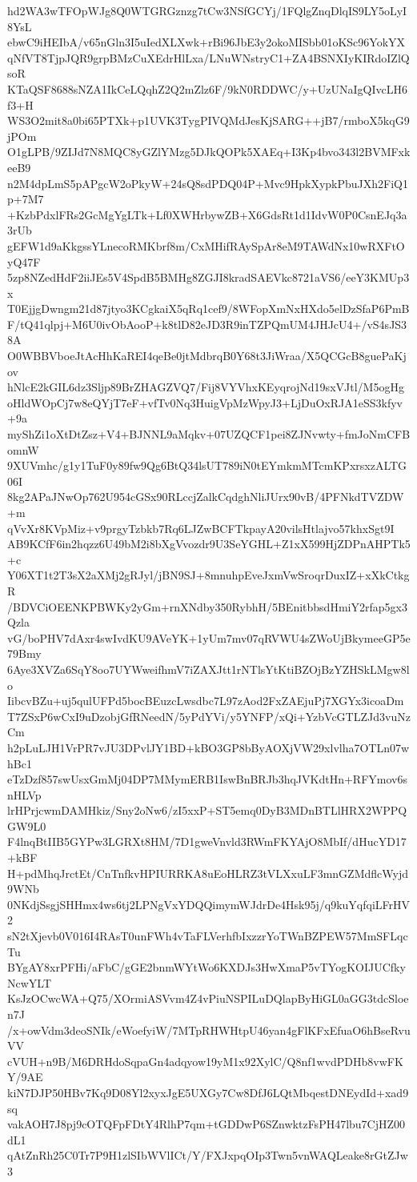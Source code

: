 hd2WA3wTFOpWJg8Q0WTGRGznzg7tCw3NSfGCYj/1FQlgZnqDlqIS9LY5oLyI8YsL
ebwC9iHEIbA/v65nGln3I5uIedXLXwk+rBi96JbE3y2okoMISbb01oKSc96YokYX
qNfVT8TjpJQR9grpBMzCuXEdrHlLxa/LNuWNstryC1+ZA4BSNXIyKIRdoIZlQsoR
KTaQSF8688sNZA1IkCeLQqhZ2Q2mZlz6F/9kN0RDDWC/y+UzUNaIgQIvcLH6f3+H
WS3O2mit8a0bi65PTXk+p1UVK3TygPIVQMdJesKjSARG++jB7/rmboX5kqG9jPOm
O1gLPB/9ZIJd7N8MQC8yGZlYMzg5DJkQOPk5XAEq+I3Kp4bvo343l2BVMFxkeeB9
n2M4dpLmS5pAPgcW2oPkyW+24sQ8sdPDQ04P+Mvc9HpkXypkPbuJXh2FiQ1p+7M7
+KzbPdxlFRs2GcMgYgLTk+Lf0XWHrbywZB+X6GdsRt1d1IdvW0P0CsnEJq3a3rUb
gEFW1d9aKkgssYLnecoRMKbrf8m/CxMHifRAySpAr8eM9TAWdNx10wRXFtOyQ47F
5zp8NZedHdF2iiJEs5V4SpdB5BMHg8ZGJI8kradSAEVkc8721aVS6/eeY3KMUp3x
T0EjjgDwngm21d87jtyo3KCgkaiX5qRq1cef9/8WFopXmNxHXdo5elDzSfaP6PmB
F/tQ41qlpj+M6U0ivObAooP+k8tlD82eJD3R9inTZPQmUM4JHJcU4+/vS4sJS38A
O0WBBVboeJtAcHhKaREI4qeBe0jtMdbrqB0Y68t3JiWraa/X5QCGcB8guePaKjov
hNlcE2kGIL6dz3Sljp89BrZHAGZVQ7/Fij8VYVhxKEyqrojNd19sxVJtl/M5ogHg
oHldWOpCj7w8eQYjT7eF+vfTv0Nq3HuigVpMzWpyJ3+LjDuOxRJA1eSS3kfyv+9a
myShZi1oXtDtZsz+V4+BJNNL9aMqkv+07UZQCF1pei8ZJNvwty+fmJoNmCFBomnW
9XUVmhc/g1y1TuF0y89fw9Qg6BtQ34lsUT789iN0tEYmkmMTcmKPxrsxzALTG06I
8kg2APaJNwOp762U954cGSx90RLccjZalkCqdghNliJUrx90vB/4PFNkdTVZDW+m
qVvXr8KVpMiz+v9prgyTzbkb7Rq6LJZwBCFTkpayA20vilsHtlajvo57khxSgt9I
AB9KCfF6in2hqzz6U49bM2i8bXgVvozdr9U3SeYGHL+Z1xX599HjZDPnAHPTk5+c
Y06XT1t2T3sX2aXMj2gRJyl/jBN9SJ+8mnuhpEveJxmVwSroqrDuxIZ+xXkCtkgR
/BDVCiOEENKPBWKy2yGm+rnXNdby350RybhH/5BEnitbbsdHmiY2rfap5gx3Qzla
vG/boPHV7dAxr4swIvdKU9AVeYK+1yUm7mv07qRVWU4sZWoUjBkymeeGP5e79Bmy
6Aye3XVZa6SqY8oo7UYWweifhmV7iZAXJtt1rNTlsYtKtiBZOjBzYZHSkLMgw8lo
IibcvBZu+uj5qulUFPd5bocBEuzcLwsdbc7L97zAod2FxZAEjuPj7XGYx3icoaDm
T7ZSxP6wCxI9uDzobjGfRNeedN/5yPdYVi/y5YNFP/xQi+YzbVcGTLZJd3vuNzCm
h2pLuLJH1VrPR7vJU3DPvlJY1BD+kBO3GP8bByAOXjVW29xlvlha7OTLn07whBc1
eTzDzf857swUsxGmMj04DP7MMymERB1IswBnBRJb3hqJVKdtHn+RFYmov6snHLVp
lrHPrjcwmDAMHkiz/Sny2oNw6/zI5xxP+ST5emq0DyB3MDnBTLlHRX2WPPQGW9L0
F4lnqBtIIB5GYPw3LGRXt8HM/7D1gweVnvld3RWmFKYAjO8MbIf/dHucYD17+kBF
H+pdMhqJrctEt/CnTnfkvHPIURRKA8uEoHLRZ3tVLXxuLF3mnGZMdflcWyjd9WNb
0NKdjSsgjSHHmx4ws6tj2LPNgVxYDQQimymWJdrDe4Hsk95j/q9kuYqfqiLFrHV2
sN2tXjevb0V016I4RAsT0unFWh4vTaFLVerhfbIxzzrYoTWnBZPEW57MmSFLqcTu
BYgAY8xrPFHi/aFbC/gGE2bnmWYtWo6KXDJs3HwXmaP5vTYogKOIJUCfkyNcwYLT
KsJzOCwcWA+Q75/XOrmiASVvm4Z4vPiuNSPILuDQlapByHiGL0aGG3tdcSloen7J
/x+owVdm3deoSNIk/eWoefyiW/7MTpRHWHtpU46yan4gFlKFxEfuaO6hBseRvuVV
cVUH+n9B/M6DRHdoSqpaGn4adqyow19yM1x92XylC/Q8nf1wvdPDHb8vwFKY/9AE
kiN7DJP50HBv7Kq9D08Yl2xyxJgE5UXGy7Cw8DfJ6LQtMbqestDNEydId+xad9sq
vakAOH7J8pj9cOTQFpFDtY4RlhP7qm+tGDDwP6SZnwktzFsPH47lbu7CjHZ00dL1
qAtZnRh25C0Tr7P9H1zlSIbWVlICt/Y/FXJxpqOIp3Twn5vnWAQLeake8rGtZJw3
